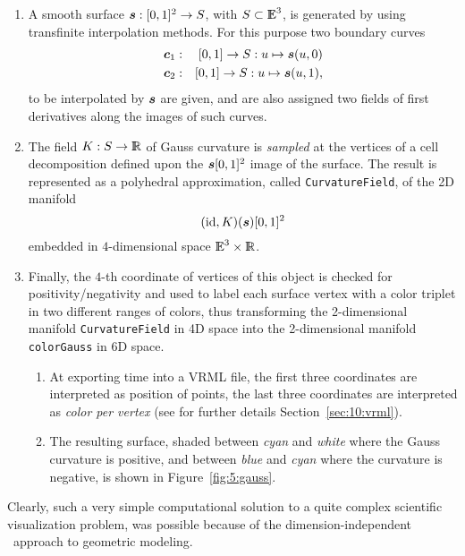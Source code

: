 \documentclass{31x47jw}
\begin{document}
\begin{enumerate}
    
    \item A smooth surface ${\mbox{\boldmath $s$}}:[0,1]^{2}\rightarrow S$, with
    $S\subset\mathbb{I\!\!E}^{3}$, is generated by using transfinite interpolation
    methods.  For this purpose two boundary curves
    \begin{eqnarray}
	{\mbox{\boldmath $c$}}_{1}&:&[0,1]\rightarrow S : u\mapsto {\mbox{\boldmath $s$}}(u,0)\\
    	{\mbox{\boldmath $c$}}_{2}&:&[0,1]\rightarrow S : u\mapsto {\mbox{\boldmath $s$}}(u,1),
    \end{eqnarray}
    to be interpolated by ${\mbox{\boldmath $s$}}$ are given, and are also assigned two
    fields of first derivatives along the images of such
    curves.
    
    \item The field $K : S\rightarrow\mathbb{I\!\!R}$ of Gauss  curvature is
    \emph{sampled} at the vertices of a cell decomposition defined
    upon the ${\mbox{\boldmath $s$}}[0,1]^{2}$ image of the surface.  The result is
    represented as a polyhedral approximation, called
    \texttt{CurvatureField}, of the 2D manifold
    \[
    (\mbox{id},K)({\mbox{\boldmath $s$}})[0,1]^{2}
    \]
    embedded in $4$-dimensional space $\mathbb{I\!\!E}^{3}\times\mathbb{I\!\!R}$.
    
    \item Finally, the $4$-th coordinate of vertices of this object is
    checked for positivity/negativity and used to label each surface
    vertex with a color triplet in two different ranges of colors, 
    thus
    transforming the 2-dimensional manifold \texttt{CurvatureField} in
    4D space into the 2-dimensional manifold \texttt{colorGauss} in 6D
    space.
    
    \begin{enumerate}
	
	\item 
    At exporting time into a \textsf{VRML} file, the first three
    coordinates are interpreted as position of points, the last three
    coordinates are interpreted as \emph{color per vertex} (see for
    further details Section~\ref{sec:10:vrml}).
    
    \item 
    The resulting surface, shaded between \emph{cyan} and \emph{white}
    where the Gauss curvature is positive, and between \emph{blue} and
    \emph{cyan} where the curvature is negative, is shown in
    Figure~\ref{fig:5:gauss}.
    \end{enumerate}

\end{enumerate}
Clearly, such a very simple computational solution to a quite complex
scientific visualization problem, was possible because of the
dimension-independent \pl\ approach to geometric modeling.
\end{document}
